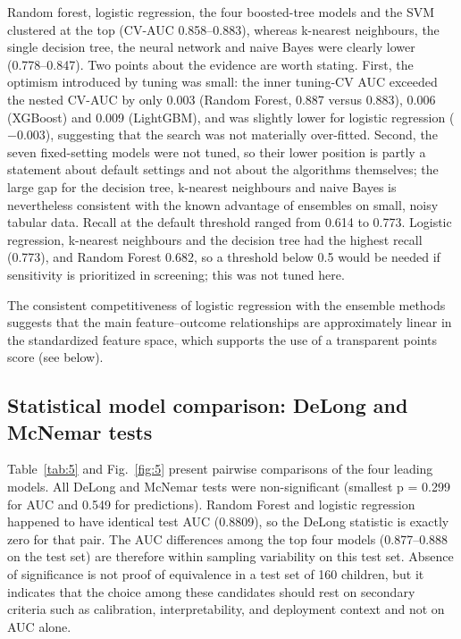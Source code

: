 \documentclass[a4paper,fleqn]{cas-dc}
\begin{document}
Random forest, logistic regression, the four boosted-tree models and the SVM clustered at the top (CV-AUC 0.858--0.883), whereas k-nearest neighbours, the single decision tree, the neural network and naive Bayes were clearly lower (0.778--0.847). Two points about the evidence are worth stating. First, the optimism introduced by tuning was small: the inner tuning-CV AUC exceeded the nested CV-AUC by only 0.003 (Random Forest, 0.887 versus 0.883), 0.006 (XGBoost) and 0.009 (LightGBM), and was slightly lower for logistic regression ($-$0.003), suggesting that the search was not materially over-fitted. Second, the seven fixed-setting models were not tuned, so their lower position is partly a statement about default settings and not about the algorithms themselves; the large gap for the decision tree, k-nearest neighbours and naive Bayes is nevertheless consistent with the known advantage of ensembles on small, noisy tabular data. Recall at the default threshold ranged from 0.614 to 0.773. Logistic regression, k-nearest neighbours and the decision tree had the highest recall (0.773), and Random Forest 0.682, so a threshold below 0.5 would be needed if sensitivity is prioritized in screening; this was not tuned here.

The consistent competitiveness of logistic regression with the ensemble methods suggests that the main feature--outcome relationships are approximately linear in the standardized feature space, which supports the use of a transparent points score (see below).

\subsection{Statistical model comparison: DeLong and McNemar tests}

Table~\ref{tab:5} and Fig.~\ref{fig:5} present pairwise comparisons of the four leading models. All DeLong and McNemar tests were non-significant (smallest p = 0.299 for AUC and 0.549 for predictions). Random Forest and logistic regression happened to have identical test AUC (0.8809), so the DeLong statistic is exactly zero for that pair. The AUC differences among the top four models (0.877--0.888 on the test set) are therefore within sampling variability on this test set. Absence of significance is not proof of equivalence in a test set of 160 children, but it indicates that the choice among these candidates should rest on secondary criteria such as calibration, interpretability, and deployment context and not on AUC alone.
\end{document}
